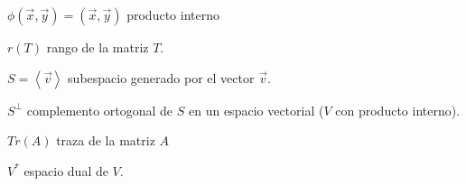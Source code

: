 \documentclass[a4paper,12pt,twopage]{book}
\begin{document}
$\phi(\vec{x},\vec{y})=(\vec{x},\vec{y})$  producto interno
\vspace{0.2cm}

$r(T)$  rango de la matriz $T$.
\vspace{0.2cm}

$S=\left\langle \vec{v}\right\rangle$   subespacio generado por el vector $\vec{v}$.
\vspace{0.2cm}

$S^{\perp}$ complemento ortogonal de $S$  en un espacio vectorial   ($V$ con producto interno).
\vspace{0.2cm}


$Tr(A)$  traza de la matriz $A$

\vspace{0.2cm}

$V^*$  espacio dual de $V$.


\printindex %

\end{document}
